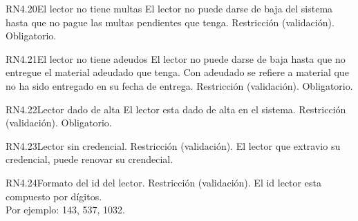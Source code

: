 
\begin{BussinesRule}{RN4.20}{El lector no tiene multas} 
	\BRitem[Descripción:] El lector no puede darse de baja del sistema hasta que no pague las multas pendientes que tenga.
	\BRitem[Tipo:] Restricción (validación).
	\BRitem[Nivel:] Obligatorio.
\end{BussinesRule}


\begin{BussinesRule}{RN4.21}{El lector no tiene adeudos} 
	\BRitem[Descripción:] El lector no puede darse de baja hasta que no entregue el material adeudado que tenga. Con adeudado se refiere a material que no ha sido entregado en su fecha de entrega.
	\BRitem[Tipo:] Restricción (validación).
	\BRitem[Nivel:] Obligatorio.
\end{BussinesRule}


\begin{BussinesRule}{RN4.22}{Lector dado de alta} 
	\BRitem[Descripción:] El lector esta dado de alta en el sistema.
	\BRitem[Tipo:] Restricción (validación).
	\BRitem[Nivel:] Obligatorio.
\end{BussinesRule}


\begin{BussinesRule}{RN4.23}{Lector sin credencial.}
	\BRitem[Tipo:] Restricción (validación).
	\BRitem[Descripción:] El lector que extravio su credencial, puede renovar su crendecial.
\end{BussinesRule}


\begin{BussinesRule}{RN4.24}{Formato del id del lector.}
	\BRitem[Tipo:] Restricción (validación).
	\BRitem[Descripción:] El id lector esta compuesto por dígitos.\\
	Por ejemplo: 143, 537, 1032.\\
\end{BussinesRule}

